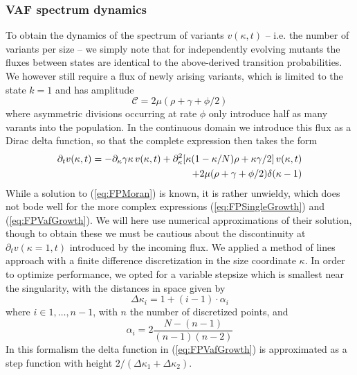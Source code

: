 \documentclass[pdftex,12pt,a4paper]{scrartcl}
\begin{document}
\subsubsection{VAF spectrum dynamics}
To obtain the dynamics of the spectrum of variants $v(\kappa,t)$ -- i.e. the number of variants per size -- we simply note that for independently evolving mutants the fluxes between states are identical to the above-derived transition probabilities. We however still require a flux of newly arising variants, which is limited to the state $k=1$
and has amplitude
\begin{equation}
    \mathcal{C} = 2\mu (\rho + \gamma + \phi/2)
\end{equation}
where asymmetric divisions occurring at rate $\phi$ only introduce half as many varants into the population. In the continuous domain we introduce this flux as a Dirac delta function, so that the complete expression then takes the form
\begin{equation}\label{eq:FPVafGrowth}
    \begin{aligned}
        \partial_t v(\kappa,t) = -\partial_\kappa \gamma \kappa \, v(\kappa,t) + \partial_\kappa^2 \qty[\kappa(1-\kappa/N)\rho + \kappa \gamma/2] \, v(\kappa,t) &\\
        + 2\mu( \rho + \gamma + \phi/2 )\delta( \kappa-1 ) &
    \end{aligned}
\end{equation}
While a solution to (\ref{eq:FPMoran}) is known, it is rather unwieldy, which does not bode well for the more complex expressions (\ref{eq:FPSingleGrowth}) and (\ref{eq:FPVafGrowth}). We will here use numerical approximations of their solution, though to obtain these we must be cautious about the discontinuity at $\partial_t v(\kappa=1, t)$ introduced by the incoming flux. We applied a method of lines approach with a finite difference discretization in the size coordinate $\kappa$. In order to optimize performance, we opted for a variable stepsize which is smallest near the singularity, with the distances in space given by
\begin{equation}
    \Delta \kappa_i = 1 + (i-1)\cdot \alpha_i
\end{equation}
where $i \in 1, \dots, n-1$, with $n$ the number of discretized points, and
\begin{equation}
    \alpha_i = 2\frac{N-(n-1)}{(n-1)(n-2)}
\end{equation}
In this formalism the delta function in (\ref{eq:FPVafGrowth}) is approximated as a step function with height $2/(\Delta \kappa_1 + \Delta \kappa_2)$.
\end{document}
